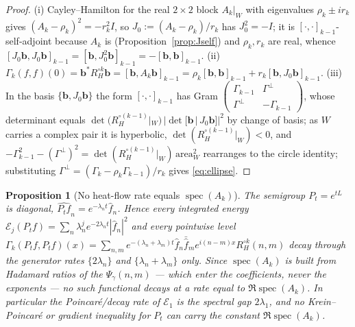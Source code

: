 \documentclass[11pt,reqno]{amsart}
\theoremstyle{plain}
\newtheorem{proposition}[theorem]{Proposition}
\theoremstyle{definition}
\newcommand{\Had}{\mathbin{\circ}}
\newcommand{\Gam}{\Gamma}
\DeclareMathOperator{\spec}{spec}
\begin{document}
\begin{proof}
(i) Cayley--Hamilton for the real $2\times2$ block $A_k|_W$ with eigenvalues
$\rho_k\pm ir_k$ gives $(A_k-\rho_k)^2=-r_k^2 I$, so $J_0:=(A_k-\rho_k)/r_k$ has
$J_0^2=-I$; it is $[\cdot,\cdot]_{k-1}$-self-adjoint because $A_k$ is
(Proposition~\ref{prop:Jself}) and $\rho_k,r_k$ are real, whence
$[J_0\mathbf b,J_0\mathbf b]_{k-1}=[\mathbf b,J_0^2\mathbf b]_{k-1}
=-[\mathbf b,\mathbf b]_{k-1}$. (ii) $\Gam_k(f,f)(0)=\mathbf b^{*}R_H^{\Had k}\mathbf b
=[\mathbf b,A_k\mathbf b]_{k-1}=\rho_k[\mathbf b,\mathbf b]_{k-1}
+r_k[\mathbf b,J_0\mathbf b]_{k-1}$. (iii) In the basis $\{\mathbf b,J_0\mathbf b\}$
the form $[\cdot,\cdot]_{k-1}$ has Gram
$\left(\begin{smallmatrix}\Gam_{k-1}&\Gam^{\perp}\\ \Gam^{\perp}&-\Gam_{k-1}\end{smallmatrix}\right)$,
whose determinant equals
$\det(R_H^{\Had(k-1)}|_W)\,|\det[\mathbf b\,|\,J_0\mathbf b]|^2$ by change of basis;
as $W$ carries a complex pair it is hyperbolic, $\det(R_H^{\Had(k-1)}|_W)<0$, and
$-\Gam_{k-1}^2-(\Gam^{\perp})^2=\det(R_H^{\Had(k-1)}|_W)\,\mathrm{area}_W^2$
rearranges to the circle identity; substituting
$\Gam^{\perp}=(\Gam_k-\rho_k\Gam_{k-1})/r_k$ gives \eqref{eq:ellipse}.
\end{proof}

\begin{proposition}[No heat-flow rate equals $\spec(A_k)$]\label{prop:nogo}
The semigroup $P_t=e^{tL}$ is diagonal, $\widehat{P_tf}_n=e^{-\lambda_n t}\hat f_n$.
Hence every integrated energy
$\mathcal E_j(P_tf)=\sum_n\lambda_n^{j}e^{-2\lambda_n t}|\hat f_n|^2$ and every
pointwise level $\Gam_k(P_tf,P_tf)(x)
=\sum_{n,m}e^{-(\lambda_n+\lambda_m)t}\hat f_n\bar{\hat f}_m e^{i(n-m)x}R_H^{\Had k}(n,m)$
decay through the generator rates $\{2\lambda_n\}$ and $\{\lambda_n+\lambda_m\}$
only. Since $\spec(A_k)$ is built from Hadamard ratios of the $\Psi_\gamma(n,m)$ ---
which enter the \emph{coefficients}, never the exponents --- no such functional
decays at a rate equal to $\Re\spec(A_k)$. In particular the Poincar\'e/decay rate
of $\mathcal E_1$ is the spectral gap $2\lambda_1$, and no Krein--Poincar\'e or
gradient inequality for $P_t$ can carry the constant $\Re\spec(A_k)$.
\end{proposition}
\end{document}
